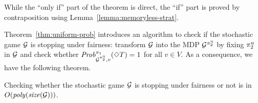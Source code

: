 While the ``only if'' part of the theorem is direct, the ``if'' part
is proved by contraposition using Lemma~\ref{lemma:memoryless-strat}.

Theorem~\ref{thm:uniform-prob} introduces an algorithm to check if the
stochastic game $\mathcal{G}$ is stopping under fairness: transform
$\mathcal{G}$ into the MDP $\mathcal{G}^{\pi^{\mathrm{u}}_{2}}$ by fixing
$\pi^{\mathrm{u}}_{2}$ in $\mathcal{G}$ and check whether
$\mathit{Prob}^{\pi_{1}}_{\mathcal{G}^{\pi^{\mathrm{u}}_{2}},v}(\Diamond T)=1$ for
all $v\in V$.
%
As a consequence, we have the following theorem.

\begin{theorem}\label{th:fair-is-poly}
  Checking whether the stochastic game $\mathcal{G}$ is stopping under
  fairness or not is in $O(\mathit{poly}(\mathit{size}(\mathcal{G})))$.
\end{theorem}



